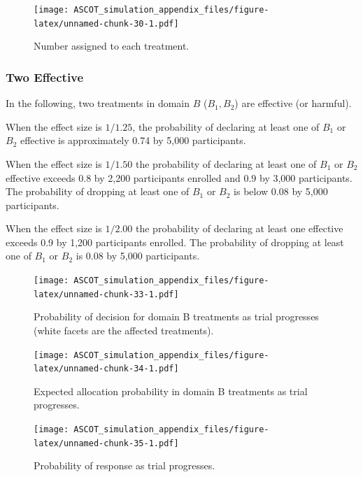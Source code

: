 \documentclass[
]{article}
\begin{document}
\begin{figure}
\centering
\texttt{[image: ASCOT\_simulation\_appendix\_files/figure-latex/unnamed-chunk-30-1.pdf]}
\caption{\label{fig:unnamed-chunk-30}Number assigned to each treatment.}
\end{figure}

\clearpage

\hypertarget{two-effective}{%
\subsubsection{Two Effective}\label{two-effective}}

In the following, two treatments in domain \(B\) (\(B_1, B_2\)) are effective (or harmful).

When the effect size is \(1/1.25\), the probability of declaring at least one of \(B_1\) or \(B_2\) effective is approximately 0.74 by 5,000 participants.

When the effect size is \(1/1.50\) the probability of declaring at least one of \(B_1\) or \(B_2\) effective exceeds 0.8 by 2,200 participants enrolled and 0.9 by 3,000 participants.
The probability of dropping at least one of \(B_1\) or \(B_2\) is below 0.08 by 5,000 participants.

When the effect size is \(1/2.00\) the probability of declaring at least one effective exceeds 0.9 by 1,200 participants enrolled.
The probability of dropping at least one of \(B_1\) or \(B_2\) is 0.08 by 5,000 participants.

\begin{figure}
\centering
\texttt{[image: ASCOT\_simulation\_appendix\_files/figure-latex/unnamed-chunk-33-1.pdf]}
\caption{\label{fig:unnamed-chunk-33}Probability of decision for domain B treatments as trial progresses (white facets are the affected treatments).}
\end{figure}

\begin{figure}
\centering
\texttt{[image: ASCOT\_simulation\_appendix\_files/figure-latex/unnamed-chunk-34-1.pdf]}
\caption{\label{fig:unnamed-chunk-34}Expected allocation probability in domain B treatments as trial progresses.}
\end{figure}

\begin{figure}
\centering
\texttt{[image: ASCOT\_simulation\_appendix\_files/figure-latex/unnamed-chunk-35-1.pdf]}
\caption{\label{fig:unnamed-chunk-35}Probability of response as trial progresses.}
\end{figure}
\end{document}
